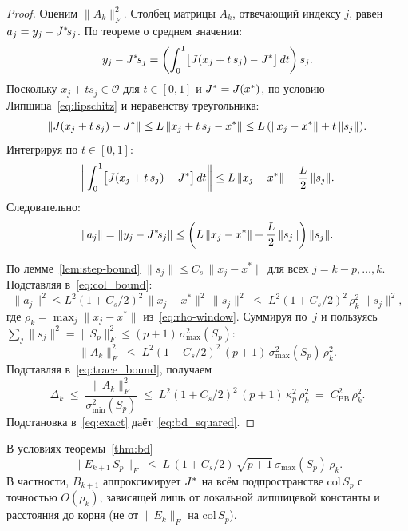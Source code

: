 \begin{proof}
Оценим $\|A_k\|_F^2$. Столбец матрицы $A_k$, отвечающий индексу $j$, равен
$a_j = y_j - J^{*}\!s_j$. По теореме о среднем значении:
\[
  y_j - J^{*}\!s_j = \left(\int_0^1 \bigl[J(x_j + t\,s_j) - J^{*}\bigr]\,dt\right) s_j.
\]
Поскольку $x_j+t s_j\in\mathcal{O}$ для $t\in[0,1]$ и $J^{*}=J(x^{*})$, по
условию Липшица~\eqref{eq:lipschitz} и неравенству треугольника:
\[
  \|J(x_j + t\,s_j) - J^{*}\| \leq L\,\|x_j + t\,s_j - x^*\|
  \leq L\,(\|x_j - x^*\| + t\,\|s_j\|).
\]
Интегрируя по $t \in [0,1]$:
\begin{equation}\label{eq:integral_bound}
  \left\|\int_0^1 \bigl[J(x_j + t\,s_j) - J^{*}\bigr]\,dt\right\|
  \leq L\,\|x_j - x^*\| + \frac{L}{2}\,\|s_j\|.
\end{equation}
Следовательно:
\begin{equation}\label{eq:col_bound}
  \|a_j\| = \|y_j - J^{*}\!s_j\|
  \leq \left(L\,\|x_j - x^*\| + \frac{L}{2}\,\|s_j\|\right)\|s_j\|.
\end{equation}

По лемме~\ref{lem:step-bound} $\|s_j\|\le C_s\,\|x_j-x^{*}\|$ для всех
$j=k-p,\ldots,k$. Подставляя в~\eqref{eq:col_bound}:
\begin{equation}\label{eq:col_bound_general}
  \|a_j\|^2 \leq L^2(1+C_s/2)^2\,\|x_j - x^*\|^2\,\|s_j\|^2
  \;\le\; L^2(1+C_s/2)^2\,\rho_k^2\,\|s_j\|^2,
\end{equation}
где $\rho_k = \max_j\|x_j-x^*\|$ из~\eqref{eq:rho-window}.
Суммируя по~$j$ и пользуясь
$\sum_j\|s_j\|^2 = \|S_p\|_F^2 \le (p+1)\,\sigma_{\max}^2(S_p)$:
\begin{equation}\label{eq:A_bound}
  \|A_k\|_F^2 \;\le\; L^2(1+C_s/2)^2\,(p+1)\,\sigma_{\max}^2(S_p)\,\rho_k^2.
\end{equation}
Подставляя в~\eqref{eq:trace_bound}, получаем
\begin{equation}\label{eq:Delta-compact}
  \Delta_k \;\le\; \frac{\|A_k\|_F^2}{\sigma_{\min}^2(S_p)}
  \;\le\; L^2(1+C_s/2)^2\,(p+1)\,\kappa_p^2\,\rho_k^2
  \;=\; C_{\mathrm{PB}}^2\,\rho_k^2.
\end{equation}
Подстановка в~\eqref{eq:exact} даёт~\eqref{eq:bd_squared}.
\end{proof}


\begin{corollary}
\label{cor:subspace-alignment}
В условиях теоремы~\ref{thm:bd}
\begin{equation}\label{eq:subspace_alignment}
  \|E_{k+1}\,S_p\|_F \;\le\; L\,(1 + C_s/2)\,\sqrt{p+1}\,
  \sigma_{\max}(S_p)\,\rho_k.
\end{equation}
В частности, $B_{k+1}$ аппроксимирует $J^{*}$ на всём подпространстве
$\mathrm{col}\,S_p$ с точностью $O(\rho_k)$, зависящей лишь от локальной
липшицевой константы и расстояния до корня (не от $\|E_k\|_F$ на
$\mathrm{col}\,S_p$).
\end{corollary}

